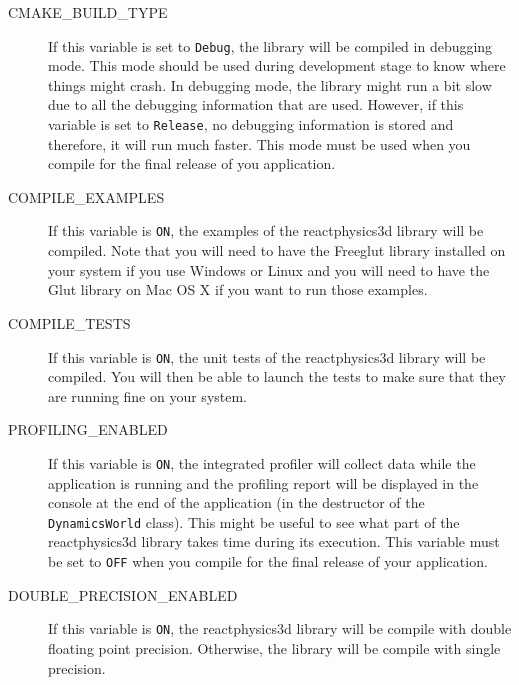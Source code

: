 \documentclass[a4paper,12pt]{article}
\begin{document}
       \begin{description}
         \item[CMAKE\_BUILD\_TYPE] If this variable is set to \texttt{Debug}, the library will be compiled in debugging mode.
                                                    This mode should be used during development stage to know where things might crash.
                                                    In debugging mode, the library might run a bit slow due to all the debugging information
                                                    that are used. However, if this variable is set to \texttt{Release}, no debugging information is stored
                                                    and therefore, it will run much faster. This mode must be used when you compile for the final
                                                    release of you application.
                                                   
         \item[COMPILE\_EXAMPLES] If this variable is \texttt{ON}, the examples of the reactphysics3d library will be compiled.
                                                    Note that you will need to have the Freeglut library installed on your system if you use
                                                    Windows or Linux and you will need to have the Glut library on Mac OS X if you want to
                                                    run those examples.

         \item[COMPILE\_TESTS] If this variable is \texttt{ON}, the unit tests of the reactphysics3d library will be compiled. You will then
                                             be able to launch the tests to make sure that they are running fine on your system.

          \item[PROFILING\_ENABLED] If this variable is \texttt{ON}, the integrated profiler will collect data while the application is running
                                                      and the profiling report will be displayed in the console at the end of the application (in the
                                                      destructor of the \texttt{DynamicsWorld} class). This might be useful to see what part of the reactphysics3d
                                                      library takes time during its execution. This variable must be set to \texttt{OFF} when you compile
                                                      for the final release of your application.

          \item[DOUBLE\_PRECISION\_ENABLED] If this variable is \texttt{ON}, the reactphysics3d library will be compile with double floating point precision.
                                                                    Otherwise, the library will be compile with single precision.
       \end{description}
       
\end{document}
